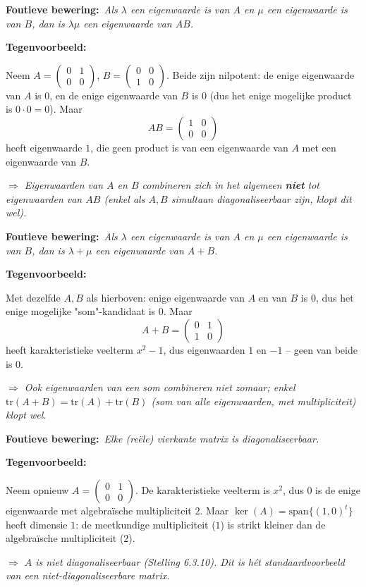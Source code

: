 \documentclass[10pt,a4paper]{article}
\newenvironment{ce}[1]{%
  \par\noindent\textbf{Foutieve bewering:}~\textit{#1}\par\noindent\textbf{Tegenvoorbeeld:}~\ignorespaces
}{%
  \par\vspace{5pt}\normalfont
}
\newcommand{\concl}[1]{\par\noindent\textit{$\Rightarrow$ #1}}
\begin{document}
\begin{ce}{Als $\lambda$ een eigenwaarde is van $A$ en $\mu$ een eigenwaarde is van $B$, dan is $\lambda\mu$ een eigenwaarde van $AB$.}
Neem $A=\begin{pmatrix}0&1\\0&0\end{pmatrix}$, $B=\begin{pmatrix}0&0\\1&0\end{pmatrix}$. Beide zijn nilpotent: de enige eigenwaarde van $A$ is $0$, en de enige eigenwaarde van $B$ is $0$ (dus het enige mogelijke product is $0\cdot0=0$). Maar
\[
AB=\begin{pmatrix}1&0\\0&0\end{pmatrix}
\]
heeft eigenwaarde $1$, die geen product is van een eigenwaarde van $A$ met een eigenwaarde van $B$.
\concl{Eigenwaarden van $A$ en $B$ combineren zich in het algemeen \textbf{niet} tot eigenwaarden van $AB$ (enkel als $A,B$ simultaan diagonaliseerbaar zijn, klopt dit wel).}
\end{ce}

\begin{ce}{Als $\lambda$ een eigenwaarde is van $A$ en $\mu$ een eigenwaarde is van $B$, dan is $\lambda+\mu$ een eigenwaarde van $A+B$.}
Met dezelfde $A,B$ als hierboven: enige eigenwaarde van $A$ en van $B$ is $0$, dus het enige mogelijke "som"-kandidaat is $0$. Maar
\[
A+B=\begin{pmatrix}0&1\\1&0\end{pmatrix}
\]
heeft karakteristieke veelterm $x^2-1$, dus eigenwaarden $1$ en $-1$ -- geen van beide is $0$.
\concl{Ook eigenwaarden van een som combineren niet zomaar; enkel $\mathrm{tr}(A+B)=\mathrm{tr}(A)+\mathrm{tr}(B)$ (som van \emph{alle} eigenwaarden, met multipliciteit) klopt wel.}
\end{ce}

\begin{ce}{Elke (re\"ele) vierkante matrix is diagonaliseerbaar.}
Neem opnieuw $A=\begin{pmatrix}0&1\\0&0\end{pmatrix}$. De karakteristieke veelterm is $x^2$, dus $0$ is de enige eigenwaarde met algebra\"ische multipliciteit $2$. Maar $\ker(A)=\mathrm{span}\{(1,0)^t\}$ heeft dimensie $1$: de meetkundige multipliciteit ($1$) is strikt kleiner dan de algebra\"ische multipliciteit ($2$).
\concl{$A$ is niet diagonaliseerbaar (Stelling 6.3.10). Dit is h\'et standaardvoorbeeld van een niet-diagonaliseerbare matrix.}
\end{ce}
\end{document}
